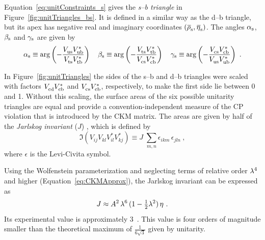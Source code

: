 Equation~\ref{eq:unitConstraints_s} gives the \emph{s--b triangle} in Figure~\ref{fig:unitTriangles_bs}. It is defined in a
similar way as the d--b triangle, but its apex has negative real and imaginary coordinates $(\rhosbar, \etasbar)$. The angles $\alpha_\text{s}$, $\beta_\text{s}$
and $\gamma_\text{s}$ are given by
\begin{equation}
  \label{eq:bsAnglesDef}
  \as \equiv \arg\left( -\frac{\Vus\Vub[*]}{\Vts\Vtb[*]} \right)
  \quad
  \bs \equiv \arg\left( -\frac{\Vts\Vtb[*]}{\Vcs\Vcb[*]} \right)
  \quad
  \gs \equiv \arg\left( -\frac{\Vcs\Vcb[*]}{\Vus\Vub[*]} \right)
  \ .
\end{equation}

In Figure~\ref{fig:unitTriangles} the sides of the s--b and d--b triangles were scaled with factors $\Vcd\Vcb[*]$ and $\Vcs\Vcb[*]$,
respectively, to make the first side lie between 0 and 1. Without this scaling, the surface areas of the six possible unitarity triangles
are equal and provide a convention-independent measure of the CP violation that is introduced by the CKM matrix. The areas are given by
half of the \emph{Jarlskog invariant} ($J$) \cite{Jarlskog:1985ht}, which is defined by
\begin{equation}
  \Im( V^{\phantom{*}}_{ij} V^{\phantom{*}}_{kl} V^{*}_{il} V^{*}_{kj} ) \equiv J\; \sum_{m,n} \epsilon_{ikm}\,\epsilon_{jln}
  \ ,
\end{equation}
where $\epsilon$ is the Levi-Civita symbol.

Using the Wolfenstein parameterization and neglecting terms of relative order $\lambda^4$ and higher (Equation~\ref{eq:CKMApprox}), the
Jarlskog invariant can be expressed as
\begin{equation}
  J \approx A^2\, \lambda^6\, (1-\tfrac{1}{2}\lambda^2)\, \eta
  \ .
\end{equation}
Its experimental value is approximately 3~\cite{Charles:2004jd,Bona:2005vz}. This value is four orders of magnitude smaller
than the theoretical maximum of $\frac{\text{1}}{\text{6}\sqrt{\text{3}}}$ given by unitarity.


